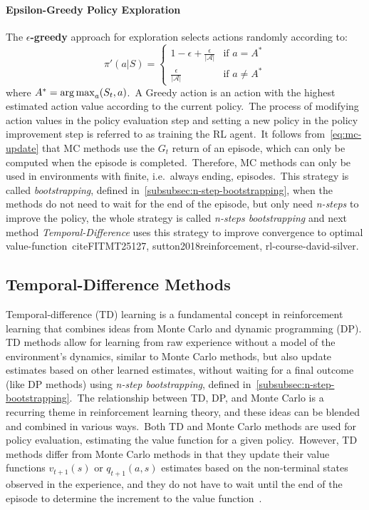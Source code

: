 \documentclass[../xlapes02]{subfiles}
\begin{document}
    \paragraph{Epsilon-Greedy Policy Exploration}
    The \textbf{$\epsilon$-greedy} approach for exploration selects actions randomly according to:
    \begin{equation}
        \label{eq:epsilon-greedy}
        \pi'(a|S)=
        \begin{cases}
            1-\epsilon+\frac{\epsilon}{|\mathcal{A}|}&\text{if }a=A^*\\
            \frac{\epsilon}{|\mathcal{A}|}&\text{if }a\neq A^*
        \end{cases}
    \end{equation}
    where $A^*=\operatorname*{arg\,max}_{a}(S_t, a)$.\ A Greedy action is an action with the highest estimated action value according to the current policy.\ The process of modifying action values in the policy evaluation step and setting a new policy in the policy improvement step is referred to as training the RL agent.\ It follows from~\cref{eq:mc-update} that MC methods use the $G_t$ return of an episode, which can only be computed when the episode is completed.\ Therefore, MC methods can only be used in environments with finite, i.e.\ always ending, episodes.\ This strategy is called \emph{bootstrapping}, defined in~\cref{subsubsec:n-step-bootstrapping}, when the methods do not need to wait for the end of the episode, but only need \emph{n-steps} to improve the policy, the whole strategy is called \emph{n-steps bootstrapping} and next method \emph{Temporal-Difference} uses this strategy to improve convergence to optimal value-function~cite{FITMT25127, sutton2018reinforcement, rl-course-david-silver}.

    \subsection{Temporal-Difference Methods}\label{subsec:temporal-difference-methods}

    Temporal-difference (TD) learning is a fundamental concept in reinforcement learning that combines ideas from Monte Carlo and dynamic programming (DP). TD methods allow for learning from raw experience without a model of the environment's dynamics, similar to Monte Carlo methods, but also update estimates based on other learned estimates, without waiting for a final outcome (like DP methods) using \emph{n-step bootstrapping}, defined in~\cref{subsubsec:n-step-bootstrapping}.\ The relationship between TD, DP, and Monte Carlo is a recurring theme in reinforcement learning theory, and these ideas can be blended and combined in various ways.\ Both TD and Monte Carlo methods are used for policy evaluation, estimating the value function for a given policy.\ However, TD methods differ from Monte Carlo methods in that they update their value functions $v_{t+1}(s)$ or $q_{t+1}(a,s)$ estimates based on the non-terminal states observed in the experience, and they do not have to wait until the end of the episode to determine the increment to the value function~\cite{rl-course-david-silver, sutton2018reinforcement}.
\end{document}
